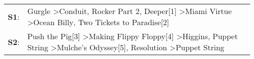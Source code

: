 \begin{supertabular}{p{0.03\textwidth}p{0.92\textwidth}}
 \textbf{S1}:  &                              Gurgle\textsuperscript{} \textgreater \enspace Conduit\textsuperscript{}, \enspace Rocker Part 2\textsuperscript{}, \enspace Deeper[1]\textsuperscript{} \textgreater \enspace Miami Virtue\textsuperscript{} \textgreater \enspace Ocean Billy\textsuperscript{}, \enspace Two Tickets to Paradise[2]\textsuperscript{}  \enspace  \\
 \textbf{S2}:  &  Push the Pig[3]\textsuperscript{} \textgreater \enspace Making Flippy Floppy[4]\textsuperscript{} \textgreater \enspace Higgins\textsuperscript{}, \enspace Puppet String\textsuperscript{} \textgreater \enspace Mulche's Odyssey[5]\textsuperscript{}, \enspace Resolution\textsuperscript{} \textgreater \enspace Puppet String\textsuperscript{}  \enspace  \\
\end{supertabular}
